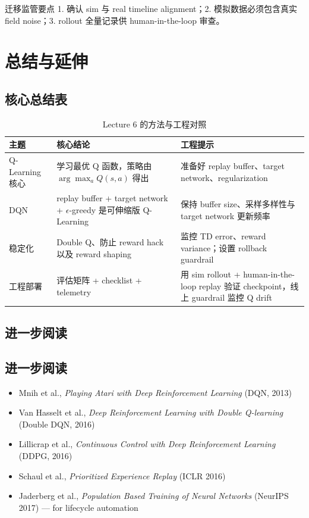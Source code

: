 \documentclass[a4paper]{article}
\begin{document}
\begin{importantbox}{迁移监管要点}
1. 确认 sim 与 real timeline alignment；2. 模拟数据必须包含真实 field noise；3. rollout 全量记录供 human-in-the-loop 审查。
\end{importantbox}

\section{总结与延伸}

\subsection{核心总结表}

\begin{table}[H]
\centering
\begin{tabular}{p{} p{} p{}}
\toprule
主题 & 核心结论 & 工程提示 \\
\midrule
Q-Learning 核心 & 学习最优 Q 函数，策略由 $\arg\max_a Q(s,a)$ 得出 & 准备好 replay buffer、target network、regularization \\
DQN & replay buffer + target network + $\epsilon$-greedy 是可伸缩版 Q-Learning & 保持 buffer size、采样多样性与 target network 更新频率 \\
稳定化 & Double Q、防止 reward hack 以及 reward shaping & 监控 TD error、reward variance；设置 rollback guardrail \\
工程部署 & 评估矩阵 + checklist + telemetry & 用 sim rollout + human-in-the-loop replay 验证 checkpoint，线上 guardrail 监控 Q drift \\
\bottomrule
\end{tabular}
\caption{Lecture 6 的方法与工程对照}
\end{table}

\subsection{进一步阅读}
\subsection{进一步阅读}

\begin{itemize}
    \item Mnih et al., \textit{Playing Atari with Deep Reinforcement Learning} (DQN, 2013)
    \item Van Hasselt et al., \textit{Deep Reinforcement Learning with Double Q-learning} (Double DQN, 2016)
    \item Lillicrap et al., \textit{Continuous Control with Deep Reinforcement Learning} (DDPG, 2016)
    \item Schaul et al., \textit{Prioritized Experience Replay} (ICLR 2016)
    \item Jaderberg et al., \textit{Population Based Training of Neural Networks} (NeurIPS 2017) — for lifecycle automation
\end{itemize}
\end{document}
